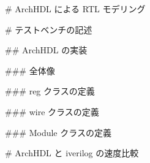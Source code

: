 # ArchHDL による RTL モデリング




# テストベンチの記述



## ArchHDL の実装



### 全体像




### reg クラスの定義





### wire クラスの定義





### Module クラスの定義








# ArchHDL と iverilog の速度比較









